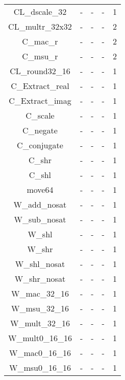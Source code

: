 \begin{longtable}{|c|c|c|c|c|}
CL\_dscale\_32          & -       & -       & -       & 1        \\
CL\_multr\_32x32        & -       & -       & -       & 2        \\
C\_mac\_r               & -       & -       & -       & 2        \\
C\_msu\_r               & -       & -       & -       & 2        \\
CL\_round32\_16         & -       & -       & -       & 1        \\
C\_Extract\_real        & -       & -       & -       & 1        \\
C\_Extract\_imag        & -       & -       & -       & 1        \\
C\_scale                & -       & -       & -       & 1        \\
C\_negate               & -       & -       & -       & 1        \\
C\_conjugate            & -       & -       & -       & 1        \\
C\_shr                  & -       & -       & -       & 1        \\
C\_shl                  & -       & -       & -       & 1        \\
move64                  & -       & -       & -       & 1        \\
W\_add\_nosat           & -       & -       & -       & 1        \\
W\_sub\_nosat           & -       & -       & -       & 1        \\
W\_shl                  & -       & -       & -       & 1        \\
W\_shr                  & -       & -       & -       & 1        \\
W\_shl\_nosat           & -       & -       & -       & 1        \\
W\_shr\_nosat           & -       & -       & -       & 1        \\
W\_mac\_32\_16          & -       & -       & -       & 1        \\
W\_msu\_32\_16          & -       & -       & -       & 1        \\
W\_mult\_32\_16         & -       & -       & -       & 1        \\
W\_mult0\_16\_16        & -       & -       & -       & 1        \\
W\_mac0\_16\_16         & -       & -       & -       & 1        \\
W\_msu0\_16\_16         & -       & -       & -       & 1        \\

\end{longtable}
